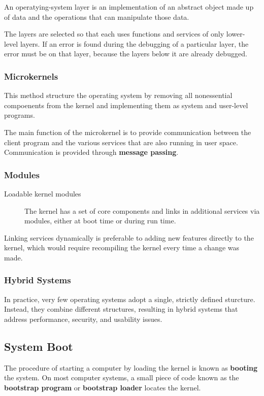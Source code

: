 \documentclass[]{article}
\begin{document}
An operatying-system layer is an implementation of an abstract object made up of
data and the operations that can manipulate those data.

The layers are selected so that each uses functions and services of only lower-
level layers. If an error is found during the debugging of a particular layer,
the error must be on that layer, because the layers below it are already
debugged.

\subsubsection*{Microkernels}
This method structure the operating system by removing all nonessential
compoenents from the kernel and implementing them as system and user-level
programs.

The main function of the microkernel is to provide communication between the
client program and the various services that are also running in user space.
Communication is provided through \textbf{message passing}.

\subsubsection*{Modules}
\begin{description}
\item[Loadable kernel modules] The kernel has a set of core components and links
in additional services via modules, either at boot time or during run time.
\end{description}

Linking services dynamically is preferable to adding new features directly to
the kernel, which would require recompiling the kernel every time a change was
made.

\subsubsection*{Hybrid Systems}
In practice, very few operating systems adopt a single, strictly defined
sturcture. Instead, they combine different structures, resulting in hybrid
systems that address performance, security, and usability issues.

\subsection*{System Boot}
The procedure of starting a computer by loading the kernel is known as
\textbf{booting} the system. On most computer systems, a small piece of code
known as the \textbf{bootstrap program} or \textbf{bootstrap loader} locates the
kernel.
\end{document}
